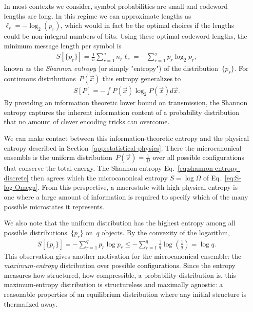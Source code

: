 In most contexts we consider, symbol probabilities are small and codeword lengths are long. In this regime we can approximate lengths as~$\ell_r = -\log_2(p_r)$, which would in fact be the optimal choices if the lengths could be non-integral numbers of bits. Using these optimal codeword lengths, the minimum message length per symbol is \begin{align}
    S[\{p_r\}] = \frac{1}{n} \sum_{r=1}^q n_r \ell_r = -\sum_{r=1}^q p_r \log_2 p_r, \label{eq:shannon-entropy-discrete}
\end{align}
known as the \emph{Shannon entropy} (or simply "entropy") of the distribution~$\{p_r\}$. For continuous distributions~$P(\vec{x})$ this entropy generalizes to \begin{align}
S[P] = -\int P(\vec{x}) \log_2 P(\vec{x}) d\vec{x}. \label{eq:shannon-entropy-continuous}
\end{align} 
By providing an information theoretic lower bound on transmission, the Shannon entropy captures the inherent information content of a probability distribution that no amount of clever encoding tricks can overcome. 

We can make contact between this information-theoretic entropy and the physical entropy described in Section~\ref{app:statistical-physics}. There the microcanonical ensemble is the uniform distribution~$P(\vec{s}) = \frac{1}{\Omega}$ over all possible configurations that conserve the total energy. The Shannon entropy Eq.~\eqref{eq:shannon-entropy-discrete} then agrees which the microcanonical entropy $S = \log \Omega$ of Eq.~\eqref{eq:S-log-Omega}. From this perspective, a macrostate with high physical entropy is one where a large amount of information is required to specify which of the many possible microstates it represents. 

We also note that the uniform distribution has the highest entropy among all possible distributions~$\{p_r\}$ on~$q$ objects. By the convexity of the logarithm, \begin{align}
    S[\{p_r\}] = -\sum_{r=1}^q p_r \log p_r \leq -\sum_{r=1}^q \frac{1}{q} \log \left(\frac{1}{q}\right) = \log q.
\end{align}
This observation gives another motivation for the microcanonical ensemble: the \emph{maximum-entropy} distribution over possible configurations. Since the entropy measures how structured, how compressible, a probability distribution is, this maximum-entropy distribution is structureless and maximally agnostic: a reasonable properties of an equilibrium distribution where any initial structure is thermalized away. 

